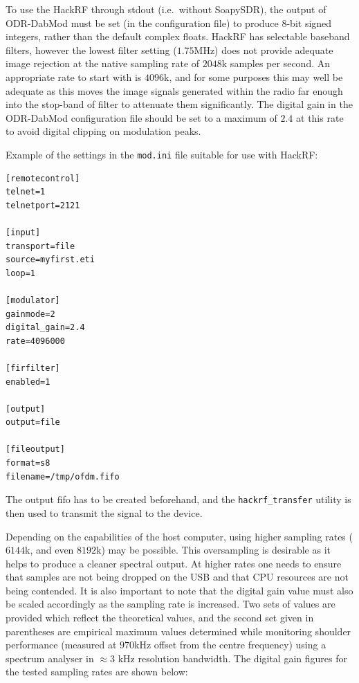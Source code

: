 To use the HackRF through stdout (i.e.\ without SoapySDR),
the output of ODR-DabMod must be set (in the configuration file) to
produce 8-bit signed integers, rather than the default complex floats.
HackRF has selectable baseband filters, however the lowest filter setting
($1.75$MHz) does not provide adequate image rejection at the native sampling rate of
$2048$k samples per second. An appropriate rate to start with is $4096$k, and for
some purposes this may well be adequate as this moves the image signals
generated within the radio far enough into the stop-band of filter to attenuate
them significantly. The digital gain in the ODR-DabMod configuration file should
be set to a maximum of $2.4$ at this rate to avoid digital clipping on modulation
peaks.

Example of the settings in the \texttt{mod.ini} file suitable for use with HackRF:

\begin{lstlisting}
[remotecontrol]
telnet=1
telnetport=2121

[input]
transport=file
source=myfirst.eti
loop=1

[modulator]
gainmode=2
digital_gain=2.4
rate=4096000

[firfilter]
enabled=1

[output]
output=file

[fileoutput]
format=s8
filename=/tmp/ofdm.fifo

\end{lstlisting}

The output fifo has to be created beforehand, and the \texttt{hackrf\_transfer}
utility is then used to transmit the signal to the device.

Depending on the capabilities of the host computer, using higher sampling rates
($6144$k, and even $8192$k) may be possible. This oversampling is desirable as
it helps to produce a cleaner spectral output. At higher rates one needs to
ensure that samples are not being dropped on the USB and that CPU resources are
not being contended. It is also important to note that the digital gain value
must also be scaled accordingly as the sampling rate is increased. Two sets of
values are provided which reflect the theoretical values, and the second set
given in parentheses are empirical maximum values determined while monitoring
shoulder performance (measured at $970$kHz offset from the centre frequency)
using a spectrum analyser in $\approx 3$ kHz resolution bandwidth. The digital
gain figures for the tested sampling rates are shown below:

